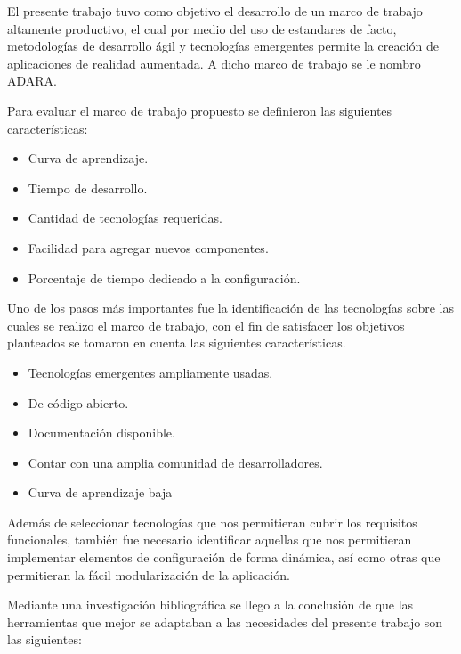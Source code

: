 \documentclass[12pt,a4paper,spanish,openany]{book}
\begin{document}
El presente trabajo tuvo como objetivo el desarrollo de un marco de trabajo
altamente productivo, el cual por medio del uso de estandares de facto,
metodologías de desarrollo ágil y tecnologías emergentes permite la creación de
aplicaciones de realidad aumentada. A dicho marco de trabajo se le nombro ADARA.

Para evaluar el marco de trabajo propuesto se definieron las siguientes
características:
\begin{itemize}
  \item Curva de aprendizaje.
  \item Tiempo de desarrollo.
  \item Cantidad de tecnologías requeridas.
  \item Facilidad para agregar nuevos componentes.
  \item Porcentaje de tiempo dedicado a la configuración.
\end{itemize}

Uno de los pasos más importantes fue la identificación de las tecnologías sobre
las cuales se realizo el marco de trabajo, con el fin de satisfacer los
objetivos planteados se tomaron en cuenta las siguientes características.

\begin{itemize}
  \item Tecnologías emergentes ampliamente usadas.
  \item De código abierto.
  \item Documentación disponible.
  \item Contar con una amplia comunidad de desarrolladores.
  \item Curva de aprendizaje baja
\end{itemize}

Además de seleccionar tecnologías que nos permitieran cubrir los requisitos
funcionales, también fue necesario identificar aquellas que nos permitieran
implementar elementos de configuración de forma dinámica, así como otras que
permitieran la fácil modularización de la aplicación.

Mediante una investigación bibliográfica se llego a la conclusión de que las
herramientas que mejor se adaptaban a las necesidades del presente trabajo son
las siguientes:
\end{document}

